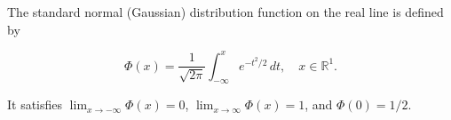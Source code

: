 The standard normal (Gaussian) distribution function on the real line is defined by

$$\Phi(x) = \frac{1}{\sqrt{2\pi}} \int_{-\infty}^{x} e^{-t^2/2} \, dt, \quad x \in \mathbb{R}^1.$$

It satisfies $\lim_{x \to -\infty} \Phi(x) = 0$, $\lim_{x \to \infty} \Phi(x) = 1$, and $\Phi(0) = 1/2$.
